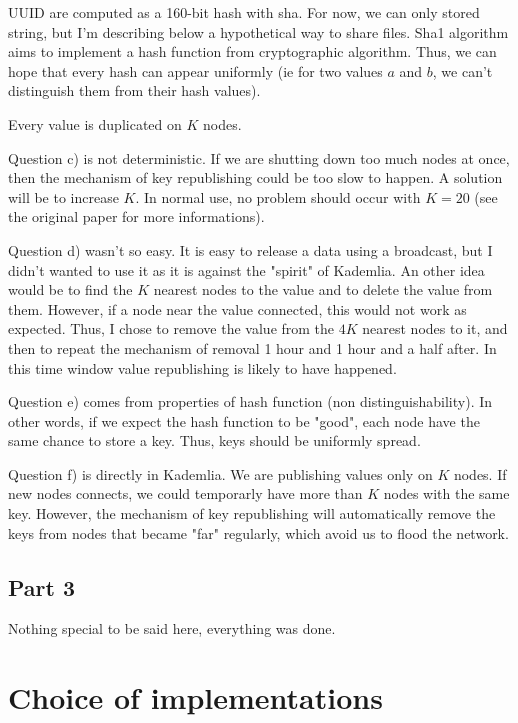 \documentclass[a4paper]{article}
\begin{document}
UUID are computed as a 160-bit hash with sha. For now, we can only stored string, but I'm describing below a hypothetical way to share files. Sha1 algorithm aims to implement a hash function from cryptographic algorithm. Thus, we can hope that every hash can appear uniformly (ie for two values $a$ and $b$, we can't distinguish them from their hash values).

Every value is duplicated on $K$ nodes.

Question c) is not deterministic. If we are shutting down too much nodes at once, then the mechanism of key republishing could be too slow to happen. A solution will be to increase $K$. In normal use, no problem should occur with $K=20$ (see the original paper for more informations).

Question d) wasn't so easy. It is easy to release a data using a broadcast, but I didn't wanted to use it as it is against the "spirit" of Kademlia. An other idea would be to find the $K$ nearest nodes to the value and to delete the value from them. However, if a node near the value connected, this would not work as expected. Thus, I chose to remove the value from the $4K$ nearest nodes to it, and then to repeat the mechanism of removal 1 hour and 1 hour and a half after. In this time window value republishing is likely to have happened.

Question e) comes from properties of hash function (non distinguishability). In other words, if we expect the hash function to be "good", each node have the same chance to store a key. Thus, keys should be uniformly spread.

Question f) is directly in Kademlia. We are publishing values only on $K$ nodes. If new nodes connects, we could temporarly have more than $K$ nodes with the same key. However, the mechanism of key republishing will automatically remove the keys from nodes that became "far" regularly, which avoid us to flood the network.

\subsection{Part 3}

Nothing special to be said here, everything was done.





\section{Choice of implementations}
\end{document}
